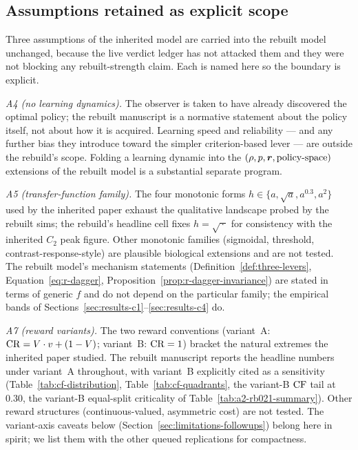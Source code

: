 \subsection{Assumptions retained as explicit scope}
\label{sec:limitations-retained}

Three assumptions of the inherited model are carried into the
rebuilt model unchanged, because the live verdict ledger has not
attacked them and they were not blocking any rebuilt-strength claim.
Each is named here so the boundary is explicit.

\emph{A4 (no learning dynamics).}  The observer is taken to have
already discovered the optimal policy; the rebuilt manuscript is a
normative statement about the policy itself, not about how it is
acquired.  Learning speed and reliability — and any further bias
they introduce toward the simpler criterion-based lever — are
outside the rebuild's scope.  Folding a learning dynamic into the
$(\rho, p, \boldsymbol{r}, \text{policy-space})$ extensions of the
rebuilt model is a substantial separate program.

\emph{A5 (transfer-function family).}  The four monotonic forms
$h \in \{a, \sqrt{a}, a^{0.3}, a^{2}\}$ used by the inherited paper
exhaust the qualitative landscape probed by the rebuilt sims; the
rebuild's headline cell fixes $h = \sqrt{\,\cdot\,}$ for
consistency with the inherited $C_2$ peak figure.  Other monotonic
families (sigmoidal, threshold, contrast-response-style) are
plausible biological extensions and are not tested.  The rebuilt
model's mechanism statements (Definition~\ref{def:three-levers},
Equation~\eqref{eq:r-dagger}, Proposition~\ref{prop:r-dagger-invariance})
are stated in terms of generic $f$ and do not depend on the
particular family; the empirical bands of
Sections~\ref{sec:results-c1}--\ref{sec:results-c4} do.

\emph{A7 (reward variants).}  The two reward conventions
(variant~A: $\mathrm{CR} = V \cdot v + (1 - V)$;
variant~B: $\mathrm{CR} = 1$) bracket the natural extremes the inherited
paper studied.  The rebuilt manuscript reports the headline numbers
under variant~A throughout, with variant~B explicitly cited as a
sensitivity (Table~\ref{tab:cf-distribution},
Table~\ref{tab:cf-quadrants}, the variant-B $\mathrm{CF}$ tail at $0.30$,
the variant-B equal-split criticality of
Table~\ref{tab:a2-rb021-summary}).  Other reward structures
(continuous-valued, asymmetric cost) are not tested.  The
variant-axis caveats below
(Section~\ref{sec:limitations-followups}) belong here in spirit; we
list them with the other queued replications for compactness.

